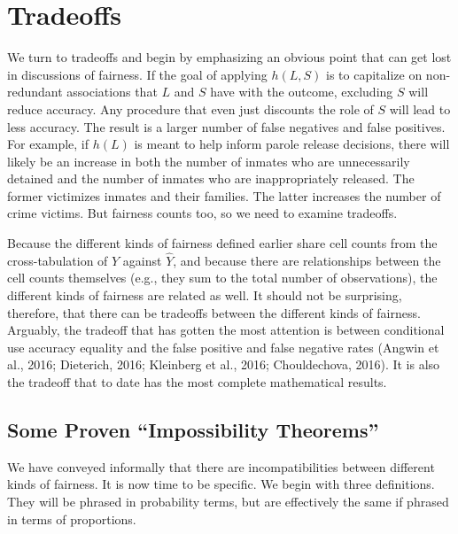 \documentclass[12pt]{article}
\begin{document}
\section{Tradeoffs}

We turn to tradeoffs and begin by emphasizing an obvious point that can get lost in discussions of fairness. If the goal of applying $h(L,S)$ is to capitalize on non-redundant associations that $L$ and $S$ have with the outcome, excluding $S$ will reduce accuracy. Any procedure that even just discounts the role of $S$ will lead to less accuracy. The result is a larger number of false negatives and false positives. For example, if $h(L)$ is meant to help inform parole release decisions, there will likely be an increase in both the number of inmates who are unnecessarily detained and the number of inmates who are inappropriately released. The former victimizes inmates and their families. The latter increases the number of crime victims. But fairness counts too, so we need to examine tradeoffs.  

Because the different kinds of fairness defined earlier share cell counts from the cross-tabulation of $Y$ against $\hat{Y}$, and because there are relationships between the cell counts themselves (e.g., they sum to the total number of observations), the different kinds of fairness are related as well. It should not be surprising, therefore, that there can be tradeoffs between the different kinds of fairness. Arguably, the tradeoff that has gotten the most attention is between conditional use accuracy equality and the false positive and false negative rates (Angwin et al., 2016; Dieterich, 2016; Kleinberg et al., 2016; Chouldechova, 2016). It is also the tradeoff that to date has the most complete mathematical results. 

\subsection{Some Proven ``Impossibility Theorems'' }

We have conveyed informally that there are incompatibilities between different kinds of fairness. It is now time to be specific. We begin with three definitions. They will be phrased in probability terms, but are effectively the same if phrased in terms of proportions. 
\end{document}
